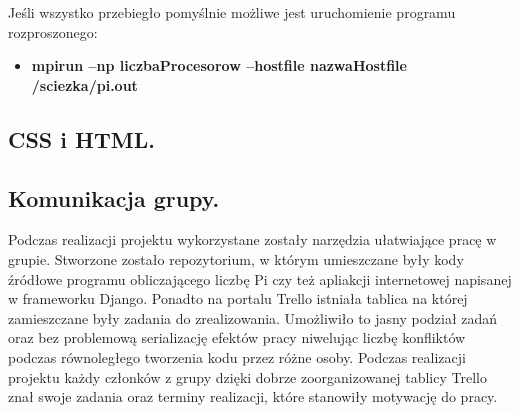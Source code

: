\documentclass[a4paper,12pt]{article}		%
\begin{document}
Jeśli wszystko przebiegło pomyślnie możliwe jest uruchomienie programu rozproszonego:
\begin{itemize}
\item \textbf{mpirun –np liczbaProcesorow –hostfile nazwaHostfile /sciezka/pi.out}
\end{itemize}
\subsection{CSS i HTML.}
\subsection{Komunikacja grupy.}
Podczas realizacji projektu wykorzystane zostały narzędzia ułatwiające pracę w grupie. Stworzone zostało repozytorium, w którym umieszczane były kody źródłowe programu obliczającego liczbę Pi czy też apliakcji internetowej napisanej w frameworku Django. Ponadto na portalu Trello istniała tablica na której zamieszczane były zadania do zrealizowania. Umożliwiło to jasny podział zadań oraz bez problemową serializację efektów pracy niwelując liczbę konfliktów podczas równoległego tworzenia kodu przez różne osoby. Podczas realizacji projektu każdy członków z grupy dzięki dobrze zoorganizowanej tablicy Trello znał swoje zadania oraz terminy realizacji, które stanowiły motywację do pracy.
\end{document}
